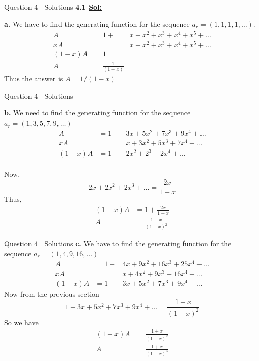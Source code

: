 \documentclass[xcolor=svgnames]{beamer}
\begin{document}
\begin{frame}{Question 4 | Solutions}
    \textbf{4.1 \underline{Sol:}}

    \textbf{a.} We have to find the generating function for the sequence $a_r = (1, 1, 1, 1, \ldots)$. 
    \begin{align*}
        A &= 1 + &x + x^2 + x^3 + x^4 + x^5 + \ldots \\
        xA &= &x + x^2 + x^3 + x^4 + x^5 + \ldots \\
        (1 - x)A &= 1 \\
        A &= \frac{1}{(1 - x)}
    \end{align*}
    Thus the answer is $A = 1/(1-x)$
\end{frame}

\begin{frame}{Question 4 | Solutions}
    
    \textbf{b.}
    We need to find the generating function for the sequence $a_r = (1, 3, 5, 7, 9, \ldots)$
    \begin{align*}
        A &= 1 + &3x + 5x^2 + 7x^3 + 9x^4 + \ldots \\
        xA &= &x + 3x^2 + 5x^3 + 7x^4 + \ldots \\
        (1 - x)A &= 1 + &2x^2 + 2^3 + 2x^4 + \ldots \\
    \end{align*}
    
    Now, 
    \[
        2x + 2x^2 + 2x^3 + \ldots = \frac{2x}{1 - x}
    \]
    Thus, 
    \begin{align*}
        (1 - x)A &= 1 + \frac{2x}{1 - x} \\
        A &= \frac{1 + x}{(1 - x)^2}
    \end{align*}
\end{frame}

\begin{frame}{Question 4 | Solutions}
    \textbf{c.} We have to find the generating function for the sequence $a_r = (1, 4, 9, 16, \ldots)$
    \begin{align*}
        A &= 1 + &4x + 9x^2 + 16x^3 + 25x^4 + \ldots \\ 
        xA &= &x + 4x^2 + 9x^3 + 16x^4 + \ldots \\
        (1-x)A &= 1 + &3x + 5x^2 + 7x^3 + 9x^4 + \ldots
    \end{align*}
    Now from the previous section 
    \[
        1 + 3x + 5x^2 + 7x^3 + 9x^4 + \ldots = \frac{1 + x}{(1 - x)^2}
    \]
    So we have 
    \begin{align*}
        (1 - x)A &= \frac{1 + x}{(1 - x)^2} \\
        A &= \frac{1 + x}{(1 - x)^3}
    \end{align*}
\end{frame}
\end{document}
